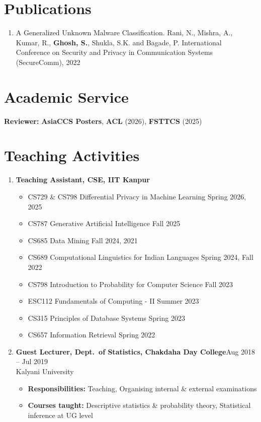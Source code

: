 \documentclass[margin,line]{res}
\begin{document}
\begin{resume}
\section{\sc Publications}
\begin{enumerate}
    \item A Generalized Unknown Malware Classification. Rani, N., Mishra, A., Kumar, R., \textbf{Ghosh, S.}, Shukla, S.K. and Bagade, P. International Conference on Security and Privacy in Communication Systems (SecureComm), 2022
\end{enumerate}

\section{\sc Academic Service}
{\bf Reviewer:} {\bf AsiaCCS Posters}, {\bf ACL} (2026), {\bf FSTTCS} (2025)

\section{\sc Teaching Activities}
\begin{enumerate}
\item {\bf Teaching Assistant, CSE, IIT Kanpur}
\begin{itemize}
    \item CS729 \& CS798 Differential Privacy in Machine Learning \hfill{Spring 2026, 2025}
    \item CS787 Generative Artificial Intelligence \hfill{Fall 2025}
    \item CS685 Data Mining \hfill{Fall 2024, 2021}
    \item CS689 Computational Linguistics for Indian Languages \hfill{Spring 2024, Fall 2022}
    \item CS798 Introduction to Probability for Computer Science \hfill{Fall 2023}
    \item ESC112 Fundamentals of Computing - II \hfill{Summer 2023}
    \item CS315 Principles of Database Systems \hfill{Spring 2023}
    \item CS657 Information Retrieval \hfill{Spring 2022}
\end{itemize}
\item {\bf Guest Lecturer, Dept.\ of Statistics, Chakdaha Day College}\hfill{Aug 2018 -- Jul 2019}\\
Kalyani University
\begin{itemize}
\item \textbf{Responsibilities:} Teaching, Organising internal \& external examinations
\item \textbf{Courses taught:} Descriptive statistics \& probability theory, Statistical inference at UG level
\end{itemize}
\end{enumerate}


\end{resume}
\end{document}
